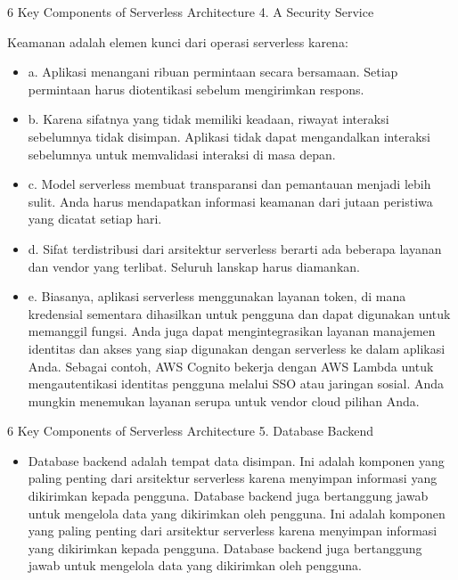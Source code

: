 \documentclass{beamer}
\begin{document}
    \begin{frame}{6 Key Components of Serverless Architecture}
    	4. A Security Service
    	
    	Keamanan adalah elemen kunci dari operasi serverless karena:
        \begin{itemize}
            \item a. Aplikasi menangani ribuan permintaan secara bersamaan. Setiap permintaan harus diotentikasi sebelum mengirimkan respons.
            \item b. Karena sifatnya yang tidak memiliki keadaan, riwayat interaksi sebelumnya tidak disimpan. Aplikasi tidak dapat mengandalkan interaksi sebelumnya untuk memvalidasi interaksi di masa depan.
            \item c. Model serverless membuat transparansi dan pemantauan menjadi lebih sulit. Anda harus mendapatkan informasi keamanan dari jutaan peristiwa yang dicatat setiap hari.
            \item d. Sifat terdistribusi dari arsitektur serverless berarti ada beberapa layanan dan vendor yang terlibat. Seluruh lanskap harus diamankan.
            \item e. Biasanya, aplikasi serverless menggunakan layanan token, di mana kredensial sementara dihasilkan untuk pengguna dan dapat digunakan untuk memanggil fungsi. Anda juga dapat mengintegrasikan layanan manajemen identitas dan akses yang siap digunakan dengan serverless ke dalam aplikasi Anda. Sebagai contoh, AWS Cognito bekerja dengan AWS Lambda untuk mengautentikasi identitas pengguna melalui SSO atau jaringan sosial. Anda mungkin menemukan layanan serupa untuk vendor cloud pilihan Anda.
        \end{itemize}
    \end{frame}

    \begin{frame}{6 Key Components of Serverless Architecture}
    	5. Database Backend
        \begin{itemize}
            \item Database backend adalah tempat data disimpan. Ini adalah komponen yang paling penting dari arsitektur serverless karena menyimpan informasi yang dikirimkan kepada pengguna. 
            Database backend juga bertanggung jawab untuk mengelola data yang dikirimkan oleh pengguna. 
            Ini adalah komponen yang paling penting dari arsitektur serverless karena menyimpan informasi yang dikirimkan kepada pengguna. 
            Database backend juga bertanggung jawab untuk mengelola data yang dikirimkan oleh pengguna.
        \end{itemize}
    \end{frame}
\end{document}
